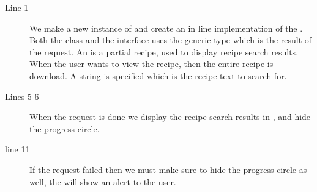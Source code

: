 \begin{description}
\item[Line 1] We make a new instance of  and create an in line implementation of the . Both the class and the interface uses the generic type  which is the result of the request. An  is a partial recipe, used to display recipe search results. When the user wants to view the recipe, then the entire recipe is download.  A  string is specified which is the recipe text to search for.
\item[Lines 5-6] When the request is done we display the recipe search results in , and hide the progress circle.
\item[line 11] If the request failed then we must make sure to hide the progress circle as well, the  will show an alert to the user.
\end{description}
